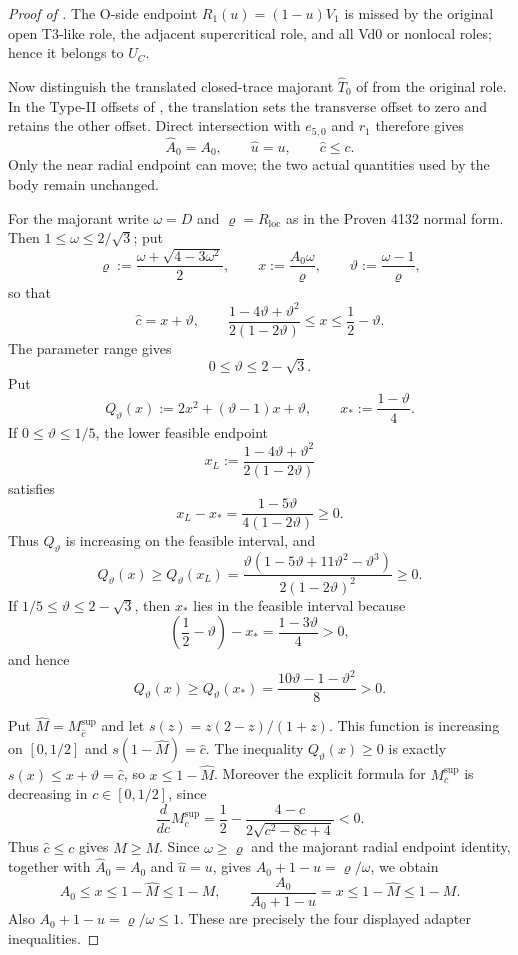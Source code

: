 \begin{proof}[Proof of ]
The O-side endpoint $R_1(u)=(1-u)V_1$ is missed by the original open
T3-like role, the adjacent supercritical role, and all Vd0 or nonlocal roles;
hence it belongs to $U_C$.

Now distinguish the translated closed-trace majorant $\widehat T_0$ of
 from the original role.  In the Type-II offsets
of , the translation sets the
transverse offset to zero and retains the other offset.  Direct intersection
with $e_{5,0}$ and $r_1$ therefore gives
\[
 \widehat A_0=A_0,
 \qquad \widehat u=u,
 \qquad \widehat c\le c.
\]
Only the near radial endpoint can move; the two actual quantities used by the
body remain unchanged.

For the majorant write $\omega=D$ and $\varrho=R_{\mathrm{loc}}$ as in the
Proven 4132 normal form.  Then $1\le\omega\le2/\sqrt3$; put
\[
 \varrho:=\frac{\omega+\sqrt{4-3\omega^2}}2,
 \qquad x:=\frac{A_0\omega}{\varrho},
 \qquad \vartheta:=\frac{\omega-1}{\varrho},
\]
so that
\[
 \widehat c=x+\vartheta,
 \qquad
 \frac{1-4\vartheta+\vartheta^2}{2(1-2\vartheta)}
 \le x\le\frac12-\vartheta.
\]
The parameter range gives
\[
 0\le\vartheta\le2-\sqrt3.
\]
Put
\[
 Q_\vartheta(x):=2x^2+(\vartheta-1)x+\vartheta,
 \qquad x_*:=\frac{1-\vartheta}{4}.
\]
If $0\le\vartheta\le1/5$, the lower feasible endpoint
\[
 x_L:=\frac{1-4\vartheta+\vartheta^2}{2(1-2\vartheta)}
\]
satisfies
\[
 x_L-x_*=\frac{1-5\vartheta}{4(1-2\vartheta)}\ge0.
\]
Thus $Q_\vartheta$ is increasing on the feasible interval, and
\[
 Q_\vartheta(x)\ge Q_\vartheta(x_L)
 =\frac{\vartheta(1-5\vartheta+11\vartheta^2-\vartheta^3)}
 {2(1-2\vartheta)^2}\ge0.
\]
If $1/5\le\vartheta\le2-\sqrt3$, then $x_*$ lies in the feasible interval
because
\[
 \left(\frac12-\vartheta\right)-x_*
 =\frac{1-3\vartheta}{4}>0,
\]
and hence
\[
 Q_\vartheta(x)\ge Q_\vartheta(x_*)
 =\frac{10\vartheta-1-\vartheta^2}{8}>0.
\]

Put $\widehat M=M_{\widehat c}^{\mathrm{sup}}$ and let
$s(z)=z(2-z)/(1+z)$.  This function is increasing on $[0,1/2]$ and
$s(1-\widehat M)=\widehat c$.  The inequality
$Q_\vartheta(x)\ge0$ is exactly
$s(x)\le x+\vartheta=\widehat c$, so $x\le1-\widehat M$.
Moreover the explicit formula for $M_c^{\mathrm{sup}}$ is decreasing in
$c\in[0,1/2]$, since
\[
 \frac{d}{dc}M_c^{\mathrm{sup}}
 =\frac12-\frac{4-c}{2\sqrt{c^2-8c+4}}<0.
\]
Thus $\widehat c\le c$ gives $\widehat M\ge M$.  Since
$\omega\ge\varrho$ and the majorant radial endpoint identity, together with
$\widehat A_0=A_0$ and $\widehat u=u$, gives
$A_0+1-u=\varrho/\omega$, we obtain
\[
 A_0\le x\le1-\widehat M\le1-M,
 \qquad
 \frac{A_0}{A_0+1-u}=x\le1-\widehat M\le1-M.
\]
Also $A_0+1-u=\varrho/\omega\le1$.  These are precisely the four displayed
adapter inequalities.
\end{proof}

